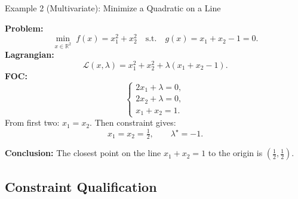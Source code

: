 \documentclass[aspectratio=169]{beamer}
\begin{document}
\begin{frame}{Example 2 (Multivariate): Minimize a Quadratic on a Line}

\textbf{Problem:}
\[
\min_{x\in\mathbb{R}^2} \; f(x)=x_1^2+x_2^2
\quad\text{s.t.}\quad g(x)=x_1+x_2-1=0.
\]
\pause
\textbf{Lagrangian:}
\[
\mathcal{L}(x,\lambda)=x_1^2+x_2^2+\lambda(x_1+x_2-1).
\]
\pause
\textbf{FOC:}
\[
\begin{cases}
2x_1+\lambda=0,\\
2x_2+\lambda=0,\\
x_1+x_2=1.
\end{cases}
\]
\pause
From first two: $
x_1=x_2.
$
Then constraint gives:
\[
x_1=x_2=\tfrac{1}{2},\qquad
\lambda^\star=-1.
\]

\textbf{Conclusion:} The closest point on the line \(x_1+x_2=1\) to the origin is \((\tfrac{1}{2},\tfrac{1}{2})\).

\end{frame}







\subsection{Constraint Qualification}
\end{document}
